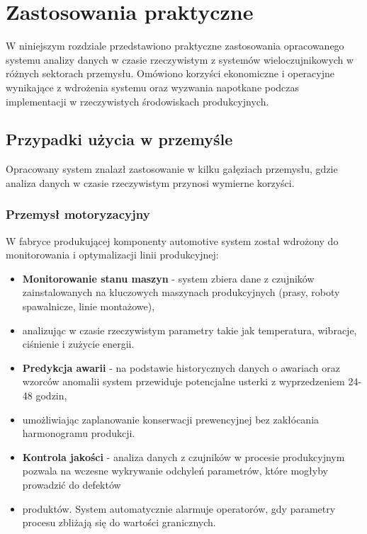 \section{Zastosowania praktyczne}
\label{sec:zastosowania_praktyczne}

W niniejszym rozdziale przedstawiono praktyczne zastosowania opracowanego systemu analizy danych w czasie rzeczywistym z
systemów wieloczujnikowych w różnych sektorach przemysłu. Omówiono korzyści ekonomiczne i operacyjne wynikające z wdrożenia systemu
oraz wyzwania napotkane podczas implementacji w rzeczywistych środowiskach produkcyjnych.

\subsection{Przypadki użycia w przemyśle}
\label{subsec:przypadki_uzycia}

Opracowany system znalazł zastosowanie w kilku gałęziach przemysłu, gdzie analiza danych w czasie rzeczywistym przynosi wymierne korzyści.

\subsubsection{Przemysł motoryzacyjny}
\label{subsubsec:przemysl_motoryzacyjny}

W fabryce produkującej komponenty automotive system został wdrożony do monitorowania i optymalizacji linii produkcyjnej:

\begin{itemize}
    \item \textbf{Monitorowanie stanu maszyn} - system zbiera dane z czujników zainstalowanych na kluczowych maszynach produkcyjnych (prasy, roboty spawalnicze, linie montażowe),
    \item analizując w czasie rzeczywistym parametry takie jak temperatura, wibracje, ciśnienie i zużycie energii.
    \item \textbf{Predykcja awarii} - na podstawie historycznych danych o awariach oraz wzorców anomalii system przewiduje potencjalne usterki z wyprzedzeniem 24-48 godzin,
    \item umożliwiając zaplanowanie konserwacji prewencyjnej bez zakłócania harmonogramu produkcji.
    \item \textbf{Kontrola jakości} - analiza danych z czujników w procesie produkcyjnym pozwala na wczesne wykrywanie odchyleń parametrów, które mogłyby prowadzić do defektów
    \item produktów. System automatycznie alarmuje operatorów, gdy parametry procesu zbliżają się do wartości granicznych.
\end{itemize}

